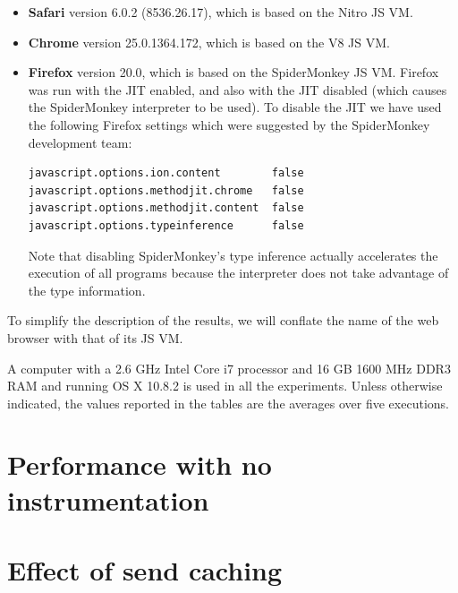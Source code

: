 \begin{itemize}

\item
{\bf Safari} version 6.0.2 (8536.26.17), which is based on the Nitro JS VM.

\item
{\bf Chrome} version 25.0.1364.172, which is based on the V8 JS VM.

\item
{\bf Firefox} version 20.0, which is based on the SpiderMonkey
JS VM.  Firefox was run with the JIT enabled, and also with
the JIT disabled (which causes the SpiderMonkey interpreter to be
used).  To disable the JIT we have used the following Firefox settings
which were suggested by the SpiderMonkey development team:

{\small
\begin{verbatim}
javascript.options.ion.content        false
javascript.options.methodjit.chrome   false 
javascript.options.methodjit.content  false
javascript.options.typeinference      false
\end{verbatim}
}

Note that disabling SpiderMonkey's type inference actually
accelerates the execution of all programs because the interpreter does
not take advantage of the type information.

\end{itemize}

To simplify the description of the results, we will conflate the name of
the web browser with that of its JS VM.

A computer with a 2.6 GHz Intel Core i7 processor and 16 GB 1600 MHz
DDR3 RAM and running OS X 10.8.2 is used in all the experiments.
Unless otherwise indicated, the values reported in the tables are the
averages over five executions.

\section{Performance with no instrumentation}


\section{Effect of send caching}

